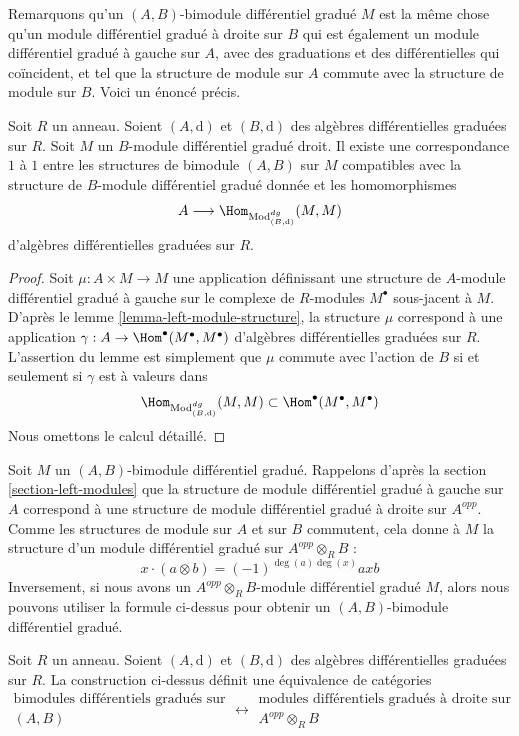 \noindent
Remarquons qu'un $(A, B)$-bimodule différentiel gradué $M$
est la même chose qu'un module différentiel gradué à droite
sur $B$ qui est également un module différentiel gradué à
gauche sur $A$, avec des graduations et des différentielles qui
coïncident, et tel que la structure de module sur $A$ commute
avec la structure de module sur $B$. Voici un énoncé précis.

\begin{lemma}
\label{lemma-what-makes-a-bimodule-dg}
Soit $R$ un anneau. Soient $(A, \text{d})$ et $(B, \text{d})$ des
algèbres différentielles graduées sur $R$. Soit $M$ un $B$-module
différentiel gradué droit. Il existe une correspondance $1$ à $1$ entre
les structures de bimodule $(A, B)$ sur $M$ compatibles avec la structure
de $B$-module différentiel gradué donnée et les homomorphismes
$$
A
\longrightarrow
\Hom_{\text{Mod}^{dg}_{(B, \text{d})}}(M, M)
$$
d'algèbres différentielles graduées sur $R$.
\end{lemma}

\begin{proof}
Soit $\mu : A \times M \to M$ une application définissant une structure de
$A$-module différentiel gradué à gauche sur le complexe de $R$-modules $M^\bullet$
sous-jacent à $M$. D'après le lemme \ref{lemma-left-module-structure}, la structure $\mu$
correspond à une application $\gamma : A \to \Hom^\bullet(M^\bullet,
M^\bullet)$ d'algèbres différentielles graduées sur $R$. L'assertion du lemme est
simplement que $\mu$ commute avec l'action de $B$ si et seulement si $\gamma$ est à
valeurs dans
$$
\Hom_{\text{Mod}^{dg}_{(B, \text{d})}}(M, M) \subset
\Hom^\bullet(M^\bullet, M^\bullet)
$$
Nous omettons le calcul détaillé.
\end{proof}

\noindent
Soit $M$ un $(A, B)$-bimodule différentiel gradué. Rappelons d'après la
section \ref{section-left-modules} que la structure de module différentiel
gradué à gauche sur $A$ correspond à une structure de module différentiel
gradué à droite sur $A^{opp}$. Comme les structures de module sur $A$ et sur $B$
commutent, cela donne à $M$ la structure d'un module différentiel
gradué sur $A^{opp} \otimes_R B$ :
$$
x \cdot (a \otimes b) = (-1)^{\deg(a)\deg(x)} axb
$$
Inversement, si nous avons un $A^{opp} \otimes_R B$-module différentiel gradué $M$,
alors nous pouvons utiliser la formule ci-dessus pour obtenir un $(A, B)$-bimodule
différentiel gradué.

\begin{lemma}
\label{lemma-bimodule-over-tensor}
Soit $R$ un anneau. Soient $(A, \text{d})$ et $(B, \text{d})$
des algèbres différentielles graduées sur $R$. La construction
ci-dessus définit une équivalence de catégories
$$
\begin{matrix}
\text{bimodules différentiels
gradués sur}\\ (A, B)\text{}
\end{matrix}
\longleftrightarrow
\begin{matrix}
\text{modules différentiels gradués à
droite sur }\\ A^{opp} \otimes_R B\text{}
\end{matrix}
$$
\end{lemma}

